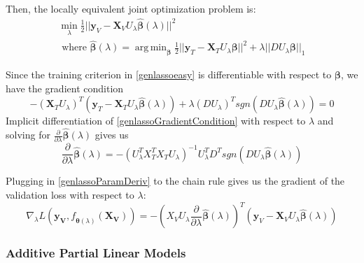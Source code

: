 \documentclass[10pt,letterpaper]{article}
\DeclareMathOperator*{\argmin}{arg\,min}
\begin{document}
Then, the locally equivalent joint optimization problem is:
\begin{equation}
\begin{array}{c}
\min_{\lambda} \frac{1}{2} \lvert\lvert \boldsymbol{y}_V - \boldsymbol{X}_V U_\lambda \hat{\boldsymbol{\beta}} (\lambda) \rvert\rvert ^2 \\
\text{ where }
\hat{\boldsymbol{\beta}} (\lambda) =
\argmin_{\boldsymbol{\beta}}
\frac{1}{2} \lvert\lvert \boldsymbol{y}_T - \boldsymbol{X}_T U_\lambda \boldsymbol{\beta} \rvert\rvert ^2
+ \lambda \lvert\lvert D U_\lambda \boldsymbol{\beta} \rvert \rvert_1
\end{array}
\label{genlassoeasy}
\end{equation}

Since the training criterion in \eqref{genlassoeasy} is differentiable with respect to $\boldsymbol \beta$, we have the gradient condition
\begin{equation}
- (\boldsymbol{X}_T U_\lambda)^T (\boldsymbol{y}_T - \boldsymbol{X}_T U_\lambda \hat {\boldsymbol\beta} (\lambda))
+ \lambda (D U_\lambda)^T sgn(DU_\lambda \hat{\boldsymbol \beta}(\lambda)) = 0
\label{genlassoGradientCondition}
\end{equation}
Implicit differentiation of \eqref{genlassoGradientCondition} with respect to $\lambda$ and solving for $\frac{\partial}{\partial \lambda} \hat{\boldsymbol \beta}(\lambda)$ gives us
\begin{equation}
\frac{\partial}{\partial \lambda} \hat{\boldsymbol \beta}(\lambda) =
-(U_\lambda^T X_T^T X_T U_\lambda)^{-1} U_\lambda^T D^T sgn(DU_\lambda \hat{\boldsymbol \beta}(\lambda))
\label{genlassoParamDeriv}
\end{equation}

Plugging in \eqref{genlassoParamDeriv} to the chain rule gives us the gradient of the validation loss with respect to $\lambda$:
\begin{equation}
\nabla_{\lambda} L(\boldsymbol{y_V}, f_{\hat{\boldsymbol{\theta}}(\lambda)}(\boldsymbol{X_V})) = 
- \left (
X_V U_\lambda
\frac{\partial}{\partial \lambda} \hat{\boldsymbol \beta}(\lambda)
\right )^T
\left (
\boldsymbol{y}_V - \boldsymbol{X}_V U_\lambda \hat{\boldsymbol{\beta}} (\lambda)
\right )
\end{equation}


\subsubsection{Additive Partial Linear Models}
\end{document}
